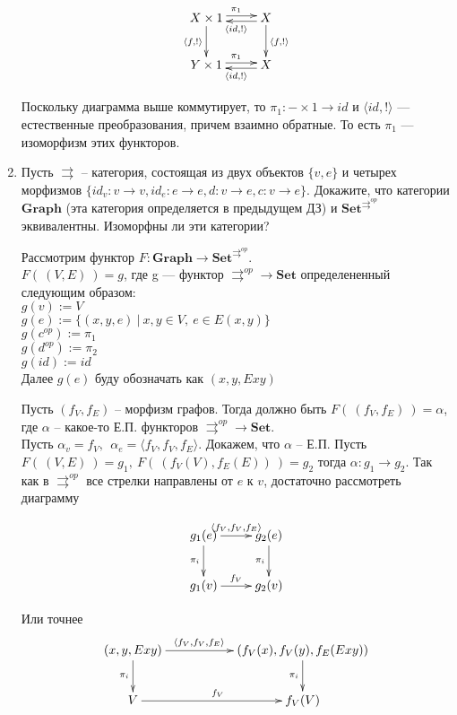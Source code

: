 \documentclass[draft]{article}
\newcommand{\cat}[1]{\mathbf{#1}}
\newcommand{\Set}{\cat{Set}}
\begin{document}
\begin{enumerate}
\[
\xymatrix{
	X \times 1 \ar@<+0.5ex>[r]^{\pi_1} \ar[d]_{\langle f, !\rangle} & X \ar@<+0.5ex>[l]^{\langle id, !\rangle}\ar[d]^{\langle f, !\rangle}\\
	Y \times 1 \ar@<+0.5ex>[r]^{\pi_1} & X \ar@<+0.5ex>[l]^{\langle id, !\rangle}
}
\]

Поскольку диаграмма выше коммутирует, то $\pi_1 : - \times 1 \to id$ и $\langle id, !\rangle$ --- естественные преобразования, причем взаимно обратные. То есть $\pi_1$ --- изоморфизм этих функторов.

\newpage
\item Пусть $\pmb{\rightrightarrows}$ -- категория, состоящая из двух объектов $\{ v, e \}$ и четырех морфизмов $\{ id_v : v \to v, id_e : e \to e, d : v \to e, c : v \to e \}$.
Докажите, что категории $\cat{Graph}$ (эта категория определяется в предыдущем ДЗ) и $\Set^{\pmb{\rightrightarrows}^{op}}$ эквивалентны.
Изоморфны ли эти категории?

Рассмотрим функтор $F: \cat{Graph} \to \Set^{\pmb{\rightrightarrows}^{op}}$.\\
$F(~(V, E)~) = g$, где g --- функтор $\pmb{\rightrightarrows}^{op} \to \Set$ определененный следующим образом:\\
$g(v) := V$\\
$g(e) := \{(x, y, e) ~|~ x, y \in V, ~e \in E(x, y)\}$\\
$g(c^{op}) := \pi_1$\\
$g(d^{op}) := \pi_2$\\
$g(id) := id$\\

Далее $g(e)$ буду обозначать как $(x, y, Exy)$

Пусть $(f_V, f_E)$ -- морфизм графов. Тогда должно быть $F(~(f_V, f_E)~) = \alpha$, где $\alpha$ -- какое-то Е.П. функторов $\pmb{\rightrightarrows}^{op} \to \Set$. \\

Пусть $\alpha_v = f_V, ~~\alpha_e = \langle f_V, f_V, f_E\rangle$. Докажем, что $\alpha$ -- Е.П. Пусть $F(~(V, E)~) = g_1, ~F(~(f_V(V), f_E(E))~) = g_2$ тогда $\alpha: g_1 \to g_2$. Так как в $\pmb{\rightrightarrows}^{op}$ все стрелки направлены от $e$ к $v$, достаточно рассмотреть диаграмму

\[
\xymatrix{
g_1(e) \ar[r]^{\langle f_V, f_V, f_E\rangle} \ar[d]_{\pi_i} & g_2(e) \ar[d]_{\pi_i}\\
g_1(v) \ar[r]^{f_V} & g_2(v)
}
\]

Или точнее
\[
\xymatrix{
(x,y,Exy) \ar[rr]^{\langle f_V, f_V, f_E\rangle~~~~~~~~~} \ar[d]_{\pi_i} & & (f_V(x),f_V(y),f_E(Exy)) \ar[d]_{\pi_i}\\
V \ar[rr]^{f_V} & & f_V(V)
}
\]


\end{enumerate}
\end{document}
